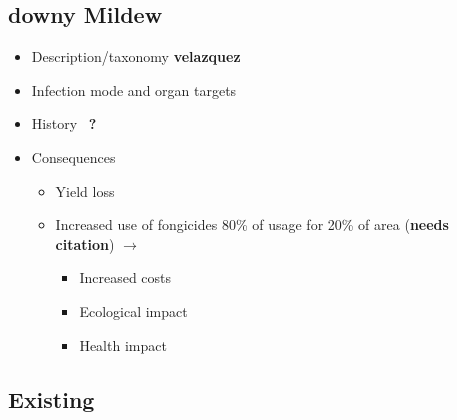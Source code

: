\documentclass[english]{article}
\begin{document}
\subsection{downy Mildew}

\begin{itemize}
	\item Description/taxonomy \textbf{velazquez}
	\item Infection mode and organ targets
	\item History~\parencite{fontaineEuropeBridgeheadWorldwide2021} \textbf{?}
	\item Consequences
	      \begin{itemize}
		      \item Yield loss
		      \item Increased use of fongicides 80\% of usage for 20\% of area (\textbf{needs citation}) $\rightarrow$
		            \begin{itemize}
			            \item Increased costs
			            \item Ecological impact
			            \item Health impact
		            \end{itemize}
	      \end{itemize}
\end{itemize}

\subsection{Existing}
\end{document}
